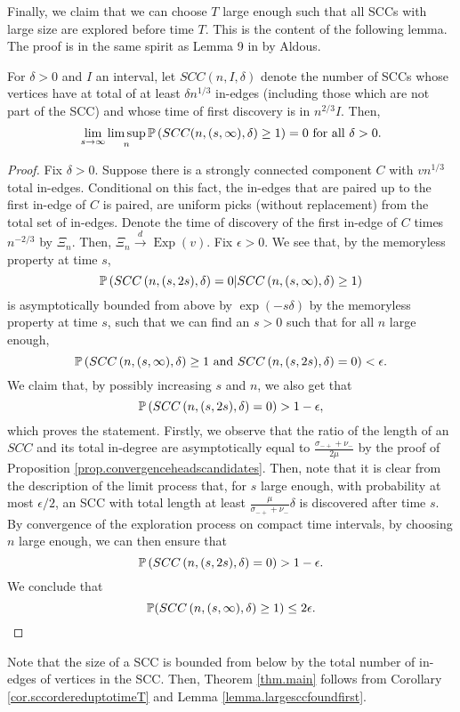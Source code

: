 Finally, we claim that we can choose $T$ large enough such that all SCCs with large size are explored before time $T$. This is the content of the following lemma. The proof is in the same spirit as Lemma 9 in \cite{aldous_1991} by Aldous. 
\begin{lemma}\label{lemma.largesccfoundfirst}
For $\delta>0$ and $I$ an interval, let $SCC(n,I,\delta)$ denote the number of SCCs whose vertices have at total of at least $\delta n^{1/3}$ in-edges (including those which are not part of the SCC) and whose time of first discovery is in $n^{2/3}I$. Then,
$$\lim_{s\to \infty}\limsup_{n} \P\left(SCC(n,(s,\infty),\delta)\geq 1\right)=0\text{ for all }\delta>0.$$
\end{lemma}
\begin{proof}
Fix $\delta>0$. Suppose there is a strongly connected component $C$ with $vn^{1/3}$ total in-edges. Conditional on this fact, the in-edges that are paired up to the first in-edge of $C$ is paired, are uniform picks (without replacement) from the total set of in-edges. Denote the time of discovery of the first in-edge of $C$ times $n^{-2/3}$ by $\Xi_n$. Then, $\Xi_n\overset{d}{\to}\operatorname{Exp}(v)$. Fix $\epsilon>0$. We see that, by the memoryless property at time $s$,
$$\P\left(SCC\left(n,(s,2s),\delta\right)=0|SCC\left(n,(s,\infty),\delta\right)\geq 1\right)$$
is asymptotically bounded from above by 
$\exp(-s\delta)$ by the memoryless property at time $s$, such that we can find an $s>0$ such that for all $n$ large enough,
$$\P\left(SCC\left(n,(s,\infty),\delta\right)\geq 1 \text{ and }SCC\left(n,(s,2s),\delta\right)=0\right)<\epsilon.$$
We claim that, by possibly increasing $s$ and $n$, we also get that 
$$\P\left(SCC\left(n,(s,2s),\delta\right)=0\right)>1-\epsilon,$$
which proves the statement.
Firstly, we observe that the ratio of the length of an $SCC$ and its total in-degree are asymptotically equal to $\frac{\sigma_{-+}+\nu_-}{2\mu}$ by the proof of Proposition \ref{prop.convergenceheadscandidates}. Then, note that it is clear from the description of the limit process that, for $s$ large enough, with probability at most $\epsilon/2$, an SCC with total length at least $\frac{\mu}{\sigma_{-+}+\nu_-}\delta$ is discovered after time $s$. By convergence of the exploration process on compact time intervals, by choosing $n$ large enough, we can then ensure that 
$$\P\left(SCC\left(n,(s,2s),\delta\right)=0\right)>1-\epsilon.$$
We conclude that 
$$\P(SCC\left(n,(s,\infty),\delta\right)\geq 1)\leq 2\epsilon.$$
\end{proof}
Note that the size of a SCC is bounded from below by the total number of in-edges of vertices in the SCC. Then, Theorem \ref{thm.main} follows from Corollary \ref{cor.sccordereduptotimeT} and Lemma \ref{lemma.largesccfoundfirst}. 

